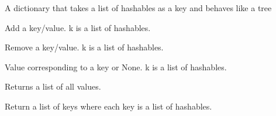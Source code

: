 \documentclass[letterpaper,10pt,english]{sphinxmanual}
\begin{document}
\begin{fulllineitems}
\label{\detokenize{ref/util/DictTree:TotalDepth.util.DictTree.DictTree}}
A dictionary that takes a list of hashables as a key and behaves like a tree

\begin{fulllineitems}
\label{\detokenize{ref/util/DictTree:TotalDepth.util.DictTree.DictTree.add}}
Add a key/value. k is a list of hashables.

\end{fulllineitems}


\begin{fulllineitems}
\label{\detokenize{ref/util/DictTree:TotalDepth.util.DictTree.DictTree.remove}}
Remove a key/value. k is a list of hashables.

\end{fulllineitems}


\begin{fulllineitems}
\label{\detokenize{ref/util/DictTree:TotalDepth.util.DictTree.DictTree.value}}
Value corresponding to a key or None. k is a list of hashables.

\end{fulllineitems}


\begin{fulllineitems}
\label{\detokenize{ref/util/DictTree:TotalDepth.util.DictTree.DictTree.values}}
Returns a list of all values.

\end{fulllineitems}


\begin{fulllineitems}
\label{\detokenize{ref/util/DictTree:TotalDepth.util.DictTree.DictTree.keys}}
Return a list of keys where each key is a list of hashables.


\end{fulllineitems}
\end{fulllineitems}
\end{document}

